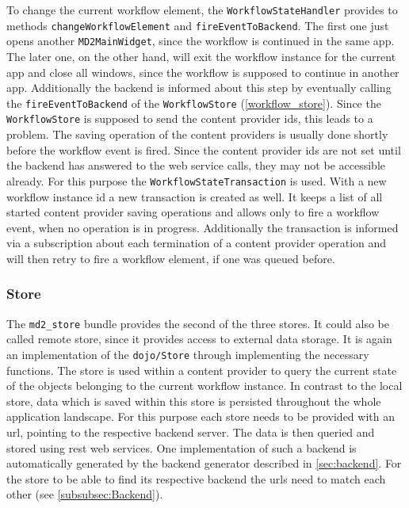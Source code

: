 To change the current workflow element, the \lstinline|WorkflowStateHandler| provides to methods \lstinline|changeWorkflowElement| and \lstinline|fireEventToBackend|. 
The first one  just opens another \lstinline|MD2MainWidget|, since the workflow is continued in the same app.
The later one, on the other hand, will exit the workflow instance for the current app and close all windows, since the workflow is supposed to continue in another app. Additionally the backend is informed about this step by eventually calling the \lstinline|fireEventToBackend| of the \lstinline|WorkflowStore| (\cref{workflow_store}). Since the \lstinline|WorkflowStore| is supposed to send the content provider ids, this leads to a problem. 
The saving operation of the content providers is usually done shortly before the workflow event is fired. Since the content provider ids are not set until the backend has answered to the web service calls, they may not be accessible already. For this purpose the \lstinline|WorkflowStateTransaction| is used. 
With a new workflow instance id a new transaction is created as well. It keeps a list of all started content provider saving operations and allows only to fire a workflow event, when no operation is in progress. Additionally the transaction is informed via a subscription about each termination of a content provider operation and will then retry to fire a workflow element, if one was queued before.

\subsubsection{Store}\label{store}

The \lstinline|md2_store| bundle provides the second of the three stores. It could also be called remote store, since it provides access to external data storage. It is again an implementation of the \lstinline|dojo/Store| through implementing the necessary functions. The store is used within a content provider to query the current state of the objects belonging to the current workflow instance. In contrast to the local store, data which is saved within this store is persisted throughout the whole application landscape. For this purpose each store needs to be provided with an url, pointing to the respective backend server. The data is then queried and stored using rest web services. One implementation of such a backend is automatically generated by the backend generator described in \cref{sec:backend}. For the store to be able to find its respective backend the urls need to match each other (see \cref{subsubsec:Backend}). 

